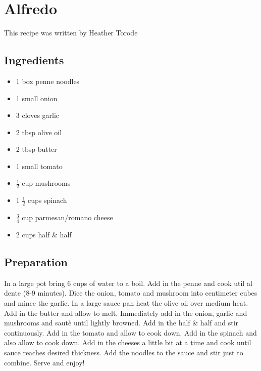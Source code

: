 \thispagestyle{fancy}
\section{Alfredo}
\AddToShipoutPicture*{\Alfredo}

This recipe was written by Heather Torode

\subsection*{Ingredients}
\begin{multicols}{3}
	\begin{itemize}
		\item 1 box penne noodles		
		\item 1 small onion		
		\item 3 cloves garlic		
		\item 2 tbsp olive oil		
		\item 2 tbsp butter		
		\item 1 small tomato		
		\item $\frac{1}{2}$ cup mushrooms		
		\item 1 $\frac{1}{2}$  cups spinach		
		\item $\frac{3}{4}$ cup parmesan/romano cheese		
		\item 2 cups half \& half
	\end{itemize}
\end{multicols}

\subsection*{Preparation}

In a large pot bring 6 cups of water to a boil. Add in the penne and cook util al dente (8-9 minutes). Dice the onion, tomato and mushroom into centimeter cubes and mince the garlic. In a large sauce pan heat the olive oil over medium heat. Add in the butter and allow to melt. Immediately add in the onion, garlic and mushrooms and saut\`{e} until lightly browned. Add in the half \& half and stir continuously. Add in the tomato and allow to cook down. Add in the spinach and also allow to cook down. Add in the cheeses a little bit at a time and cook until sauce reaches desired thickness. Add the noodles to the sauce and stir just to combine. Serve and enjoy!